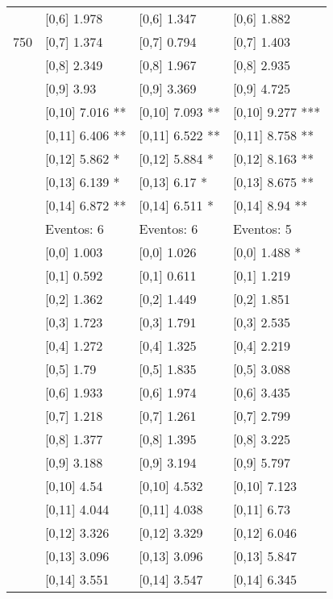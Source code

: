 \begin{table}
\begin{tabular}[t]{llll}
 & {}[0,6] 1.978 & {}[0,6] 1.347 & {}[0,6] 1.882\\
750 & {}[0,7] 1.374 & {}[0,7] 0.794 & {}[0,7] 1.403\\
\addlinespace
 & {}[0,8] 2.349 & {}[0,8] 1.967 & {}[0,8] 2.935\\
 & {}[0,9] 3.93 & {}[0,9] 3.369 & {}[0,9] 4.725\\
 & {}[0,10] 7.016 ** & {}[0,10] 7.093 ** & {}[0,10] 9.277 ***\\
 & {}[0,11] 6.406 ** & {}[0,11] 6.522 ** & {}[0,11] 8.758 **\\
 & {}[0,12] 5.862 * & {}[0,12] 5.884 * & {}[0,12] 8.163 **\\
\addlinespace
 & {}[0,13] 6.139 * & {}[0,13] 6.17 * & {}[0,13] 8.675 **\\
 & {}[0,14] 6.872 ** & {}[0,14] 6.511 * & {}[0,14] 8.94 **\\
 & Eventos:  6 & Eventos:  6 & Eventos:  5\\
 & {}[0,0] 1.003 & {}[0,0] 1.026 & {}[0,0] 1.488 *\\
 & {}[0,1] 0.592 & {}[0,1] 0.611 & {}[0,1] 1.219\\
\addlinespace
 & {}[0,2] 1.362 & {}[0,2] 1.449 & {}[0,2] 1.851\\
 & {}[0,3] 1.723 & {}[0,3] 1.791 & {}[0,3] 2.535\\
 & {}[0,4] 1.272 & {}[0,4] 1.325 & {}[0,4] 2.219\\
 & {}[0,5] 1.79 & {}[0,5] 1.835 & {}[0,5] 3.088\\
 & {}[0,6] 1.933 & {}[0,6] 1.974 & {}[0,6] 3.435\\
\addlinespace
1000 & {}[0,7] 1.218 & {}[0,7] 1.261 & {}[0,7] 2.799\\
 & {}[0,8] 1.377 & {}[0,8] 1.395 & {}[0,8] 3.225\\
 & {}[0,9] 3.188 & {}[0,9] 3.194 & {}[0,9] 5.797\\
 & {}[0,10] 4.54 & {}[0,10] 4.532 & {}[0,10] 7.123\\
 & {}[0,11] 4.044 & {}[0,11] 4.038 & {}[0,11] 6.73\\
\addlinespace
 & {}[0,12] 3.326 & {}[0,12] 3.329 & {}[0,12] 6.046\\
 & {}[0,13] 3.096 & {}[0,13] 3.096 & {}[0,13] 5.847\\
 & {}[0,14] 3.551 & {}[0,14] 3.547 & {}[0,14] 6.345\\
\bottomrule
\end{tabular}
\end{table}

